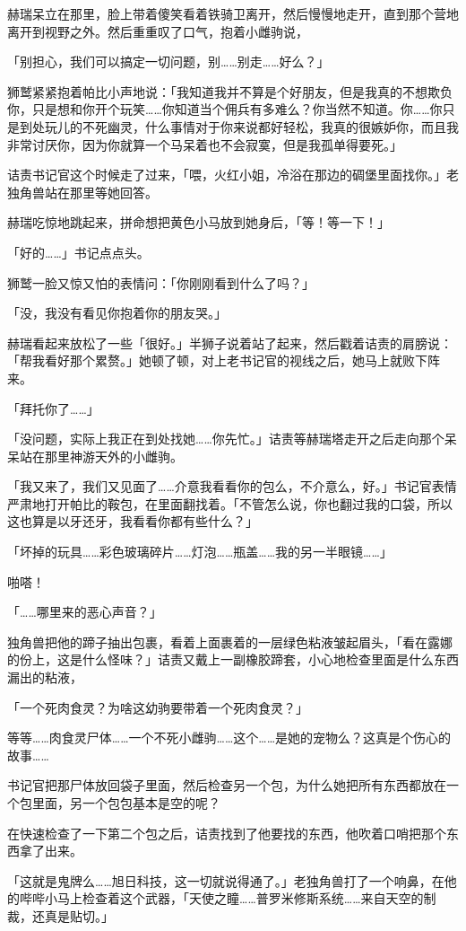 赫瑞呆立在那里，脸上带着傻笑看着铁骑卫离开，然后慢慢地走开，直到那个营地离开到视野之外。然后重重叹了口气，抱着小雌驹说，

「别担心，我们可以搞定一切问题，别……别走……好么？」

狮鹫紧紧抱着帕比小声地说：「我知道我并不算是个好朋友，但是我真的不想欺负你，只是想和你开个玩笑……你知道当个佣兵有多难么？你当然不知道。你……你只是到处玩儿的不死幽灵，什么事情对于你来说都好轻松，我真的很嫉妒你，而且我非常讨厌你，因为你就算一个马呆着也不会寂寞，但是我孤单得要死。」

诘责书记官这个时候走了过来，「喂，火红小姐，冷浴在那边的碉堡里面找你。」老独角兽站在那里等她回答。

赫瑞吃惊地跳起来，拼命想把黄色小马放到她身后，「等！等一下！」

「好的……」书记点点头。

狮鹫一脸又惊又怕的表情问：「你刚刚看到什么了吗？」

「没，我没有看见你抱着你的朋友哭。」

赫瑞看起来放松了一些「很好。」半狮子说着站了起来，然后戳着诘责的肩膀说：「帮我看好那个累赘。」她顿了顿，对上老书记官的视线之后，她马上就败下阵来。

「拜托你了……」

「没问题，实际上我正在到处找她……你先忙。」诘责等赫瑞塔走开之后走向那个呆呆站在那里神游天外的小雌驹。

「我又来了，我们又见面了……介意我看看你的包么，不介意么，好。」书记官表情严肃地打开帕比的鞍包，在里面翻找着。「不管怎么说，你也翻过我的口袋，所以这也算是以牙还牙，我看看你都有些什么？」

「坏掉的玩具……彩色玻璃碎片……灯泡……瓶盖……我的另一半眼镜……」

啪嗒！

「……哪里来的恶心声音？」

独角兽把他的蹄子抽出包裹，看着上面裹着的一层绿色粘液皱起眉头，「看在露娜的份上，这是什么怪味？」诘责又戴上一副橡胶蹄套，小心地检查里面是什么东西漏出的粘液，

「一个死肉食灵？为啥这幼驹要带着一个死肉食灵？」

等等……肉食灵尸体……一个不死小雌驹……这个……是她的宠物么？这真是个伤心的故事……{}

书记官把那尸体放回袋子里面，然后检查另一个包，为什么她把所有东西都放在一个包里面，另一个包包基本是空的呢？

在快速检查了一下第二个包之后，诘责找到了他要找的东西，他吹着口哨把那个东西拿了出来。

「这就是鬼牌么……旭日科技，这一切就说得通了。」老独角兽打了一个响鼻，在他的哔哔小马上检查着这个武器，「天使之瞳……普罗米修斯系统……来自天空的制裁，还真是贴切。」


